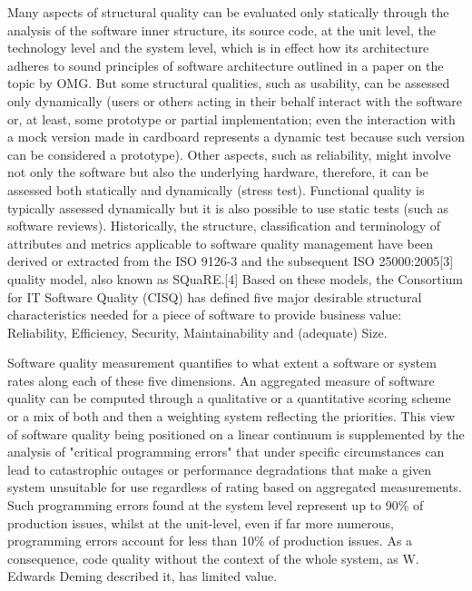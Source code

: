 Many aspects of structural quality can be evaluated only statically through the analysis of the software inner structure, its source code, at the unit level, the technology level and the system level, which is in effect how its architecture adheres to sound principles of software architecture outlined in a paper on the topic by OMG. But some structural qualities, such as usability, can be assessed only dynamically (users or others acting in their behalf interact with the software or, at least, some prototype or partial implementation; even the interaction with a mock version made in cardboard represents a dynamic test because such version can be considered a prototype). Other aspects, such as reliability, might involve not only the software but also the underlying hardware, therefore, it can be assessed both statically and dynamically (stress test).
Functional quality is typically assessed dynamically but it is also possible to use static tests (such as software reviews).
Historically, the structure, classification and terminology of attributes and metrics applicable to software quality management have been derived or extracted from the ISO 9126-3 and the subsequent ISO 25000:2005[3] quality model, also known as SQuaRE.[4] Based on these models, the Consortium for IT Software Quality (CISQ) has defined five major desirable structural characteristics needed for a piece of software to provide business value: Reliability, Efficiency, Security, Maintainability and (adequate) Size.
\newline


Software quality measurement quantifies to what extent a software or system rates along each of these five dimensions. An aggregated measure of software quality can be computed through a qualitative or a quantitative scoring scheme or a mix of both and then a weighting system reflecting the priorities. This view of software quality being positioned on a linear continuum is supplemented by the analysis of "critical programming errors" that under specific circumstances can lead to catastrophic outages or performance degradations that make a given system unsuitable for use regardless of rating based on aggregated measurements. Such programming errors found at the system level represent up to 90\% of production issues, whilst at the unit-level, even if far more numerous, programming errors account for less than 10\% of production issues. As a consequence, code quality without the context of the whole system, as W. Edwards Deming described it, has limited value.
\newline
 
